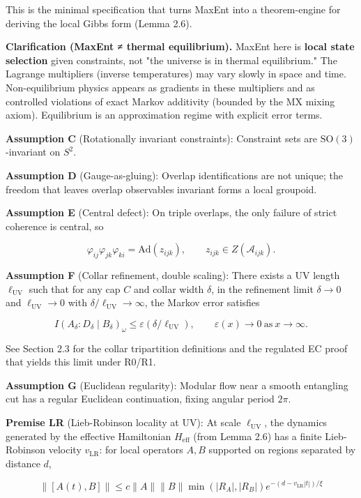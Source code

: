 This is the minimal specification that turns MaxEnt into a theorem-engine for deriving the local Gibbs form (Lemma 2.6).

\textbf{Clarification (MaxEnt ≠ thermal equilibrium).} MaxEnt here is \textbf{local state selection} given constraints, not "the universe is in thermal equilibrium." The Lagrange multipliers (inverse temperatures) may vary slowly in space and time. Non-equilibrium physics appears as gradients in these multipliers and as controlled violations of exact Markov additivity (bounded by the MX mixing axiom). Equilibrium is an approximation regime with explicit error terms.

\textbf{Assumption C} (Rotationally invariant constraints): Constraint sets are \(\mathrm{SO}(3)\)-invariant on \(S^2\).

\textbf{Assumption D} (Gauge-as-gluing): Overlap identifications are not unique; the freedom that leaves overlap observables invariant forms a local groupoid.

\textbf{Assumption E} (Central defect): On triple overlaps, the only failure of strict coherence is central, so

\[
\varphi_{ij} \varphi_{jk} \varphi_{ki} = \mathrm{Ad}(z_{ijk}),\qquad z_{ijk} \in Z(\mathcal{A}_{ijk}).
\]

\textbf{Assumption F} (Collar refinement, double scaling): There exists a UV length \(\ell_{\mathrm{UV}}\) such that for any cap \(C\) and collar width \(\delta\), in the refinement limit \(\delta \to 0\) and \(\ell_{\mathrm{UV}} \to 0\) with \(\delta/\ell_{\mathrm{UV}} \to \infty\), the Markov error satisfies

\[
I(A_\delta:D_\delta \mid B_\delta)_\omega \le \varepsilon(\delta/\ell_{\mathrm{UV}}),
\qquad \varepsilon(x) \to 0 \ \text{as} \ x \to \infty.
\]

See Section 2.3 for the collar tripartition definitions and the regulated EC proof that yields this limit under R0/R1.

\textbf{Assumption G} (Euclidean regularity): Modular flow near a smooth entangling cut has a regular Euclidean continuation, fixing angular period \(2\pi\).

\textbf{Premise LR} (Lieb-Robinson locality at UV): At scale \(\ell_{\mathrm{UV}}\), the dynamics generated by the effective Hamiltonian \(H_{\mathrm{eff}}\) (from Lemma 2.6) has a finite Lieb-Robinson velocity \(v_{\mathrm{LR}}\): for local operators \(A, B\) supported on regions separated by distance \(d\),

\[
\|[A(t), B]\| \le c \|A\| \|B\| \min(|R_A|, |R_B|) e^{-(d - v_{\mathrm{LR}}|t|)/\xi}
\]

